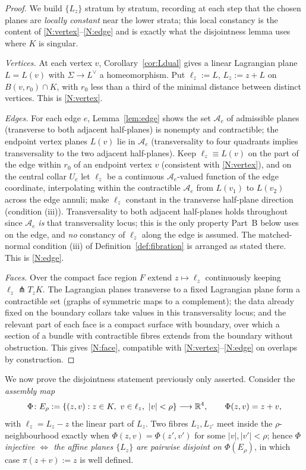 \begin{proof}
We build $\{L_z\}$ stratum by stratum, recording at each step that the chosen planes
are \emph{locally constant} near the lower strata; this local constancy is the content
of \ref{N:vertex}--\ref{N:edge} and is exactly what the disjointness lemma uses where
$K$ is singular.

\emph{Vertices.} At each vertex $v$, Corollary~\ref{cor:Ldual} gives a linear
Lagrangian plane $L=L(v)$ with $\Sigma\to L^\vee$ a homeomorphism. Put $\ell_z:=L$,
$L_z:=z+L$ on $B(v,r_0)\cap K$, with $r_0$ less than a third of the minimal distance
between distinct vertices. This is \ref{N:vertex}.

\emph{Edges.} For each edge $e$, Lemma~\ref{lem:edge} shows the set $\mathcal A_e$ of
admissible planes (transverse to both adjacent half-planes) is nonempty and
contractible; the endpoint vertex planes $L(v)$ lie in $\mathcal A_e$ (transversality
to four quadrants implies transversality to the two adjacent half-planes). Keep
$\ell_z\equiv L(v)$ on the part of the edge within $r_0$ of an endpoint vertex $v$
(consistent with \ref{N:vertex}), and on the central collar $U_e$ let $\ell_z$ be a
continuous $\mathcal A_e$-valued function of the edge coordinate, interpolating within
the contractible $\mathcal A_e$ from $L(v_1)$ to $L(v_2)$ across the edge annuli;
make $\ell_z$ constant in the transverse half-plane direction (condition (iii)).
Transversality to both adjacent half-planes holds throughout since $\mathcal A_e$
\emph{is} that transversality locus; this is the only property Part~B below uses on
the edge, and \emph{no} constancy of $\ell_z$ along the edge is assumed. The
matched-normal condition (iii) of Definition~\ref{def:fibration} is arranged as stated
there. This is \ref{N:edge}.

\emph{Faces.} Over the compact face region $F$ extend $z\mapsto\ell_z$ continuously
keeping $\ell_z\pitchfork T_zK$. The Lagrangian planes transverse to a fixed
Lagrangian plane form a contractible set (graphs of symmetric maps to a complement);
the data already fixed on the boundary collars take values in this transversality
locus; and the relevant part of each face is a compact surface with boundary, over
which a section of a bundle with contractible fibres extends from the boundary without
obstruction. This gives \ref{N:face}, compatible with \ref{N:vertex}--\ref{N:edge} on
overlaps by construction.
\end{proof}

We now prove the disjointness statement previously only asserted. Consider the
\emph{assembly map}
\[
\Phi\colon E_\rho:=\{(z,v):z\in K,\ v\in\ell_z,\ |v|<\rho\}\longrightarrow\qeightR^4,
\qquad \Phi(z,v)=z+v ,
\]
with $\ell_z=L_z-z$ the linear part of $L_z$. Two fibres $L_z,L_{z'}$ meet inside the
$\rho$-neighbourhood exactly when $\Phi(z,v)=\Phi(z',v')$ for some $|v|,|v'|<\rho$;
hence \emph{$\Phi$ injective $\iff$ the affine planes $\{L_z\}$ are pairwise disjoint
on $\Phi(E_\rho)$}, in which case $\pi(z+v):=z$ is well defined.

